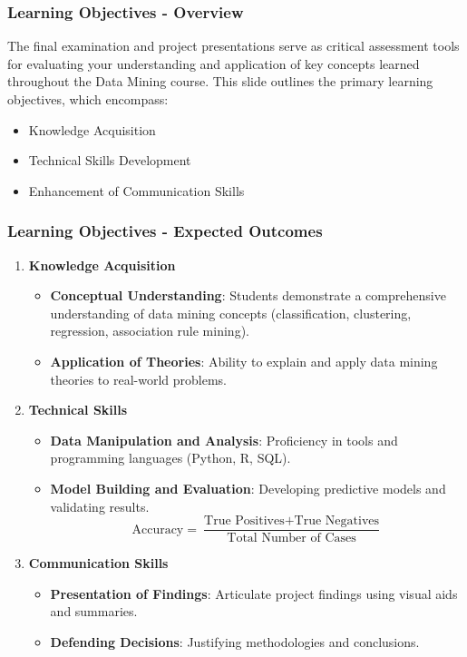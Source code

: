 \documentclass[aspectratio=169]{beamer}
\begin{document}
\begin{frame}[fragile]
    \frametitle{Learning Objectives - Overview}
    The final examination and project presentations serve as critical assessment tools for evaluating your understanding and application of key concepts learned throughout the Data Mining course. 
    This slide outlines the primary learning objectives, which encompass:
    \begin{itemize}
        \item Knowledge Acquisition
        \item Technical Skills Development
        \item Enhancement of Communication Skills
    \end{itemize}
\end{frame}

\begin{frame}[fragile]
    \frametitle{Learning Objectives - Expected Outcomes}
    \begin{enumerate}
        \item \textbf{Knowledge Acquisition}
        \begin{itemize}
            \item \textbf{Conceptual Understanding}: 
            Students demonstrate a comprehensive understanding of data mining concepts (classification, clustering, regression, association rule mining).
            \item \textbf{Application of Theories}: 
            Ability to explain and apply data mining theories to real-world problems.
        \end{itemize}
        
        \item \textbf{Technical Skills}
        \begin{itemize}
            \item \textbf{Data Manipulation and Analysis}: 
            Proficiency in tools and programming languages (Python, R, SQL).
            \item \textbf{Model Building and Evaluation}: 
            Developing predictive models and validating results.
            \begin{equation}
                \text{Accuracy} = \frac{\text{True Positives} + \text{True Negatives}}{\text{Total Number of Cases}}
            \end{equation}
        \end{itemize}

        \item \textbf{Communication Skills}
        \begin{itemize}
            \item \textbf{Presentation of Findings}: 
            Articulate project findings using visual aids and summaries.
            \item \textbf{Defending Decisions}: 
            Justifying methodologies and conclusions.
        \end{itemize}
    \end{enumerate}
\end{frame}
\end{document}

